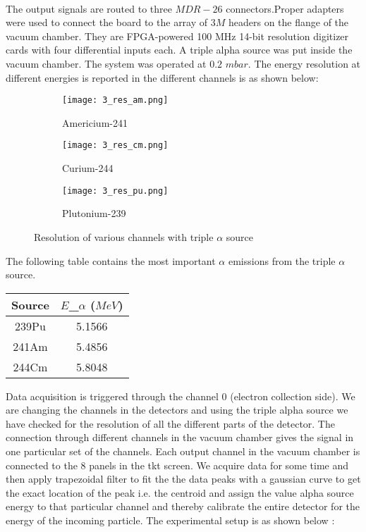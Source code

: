 \documentclass[a4paper, 11pt]{article}
\begin{document}
\paragraph{}
The  output  signals  are  routed  to  three $MDR - 26$  connectors.Proper adapters were used to connect the board to the array of $3M$ headers on the flange of the vacuum chamber. They are FPGA-powered 100 MHz 14-bit resolution digitizer cards with four  differential  inputs  each.  A triple alpha source was put inside the vacuum chamber.  The  system  was  operated  at  $0.2$  $mbar$.  The  energy resolution at different energies is reported in the different channels is as shown below:
 
\begin{figure}[h]
 
\begin{subfigure}{0.5\textwidth}
\texttt{[image: 3\_res\_am.png]} 
\caption{Americium-241}
\label{fig:subim1}
\end{subfigure}
\begin{subfigure}{0.5\textwidth}
\texttt{[image: 3\_res\_cm.png]}
\caption{Curium-244}
\label{fig:subim2}
\end{subfigure}

\begin{subfigure}{0.5\textwidth}
\centering
\texttt{[image: 3\_res\_pu.png]}
\caption{Plutonium-239}
\label{fig:subim2}
\end{subfigure}

\caption{Resolution of various channels with triple $\alpha$ source}
\label{fig:image2}

\end{figure} 
The following table contains the most important $\alpha$  emissions from the triple $\alpha$  source.

\begin{center}
\begin{tabular}{ |c|c| } 
 \hline
 Source & $E$_$\alpha$ ($MeV$)  \\ 
 \hline
 239Pu & 5.1566  \\
 \hline
 241Am & 5.4856  \\ 
 \hline
 244Cm & 5.8048 \\
 \hline
\end{tabular}
\end{center}


 
Data acquisition is triggered through the channel $0$ (electron collection side). We are changing the channels in the detectors and using the triple alpha source we have checked for the resolution of all the different parts of the detector. The connection through different channels in the vacuum chamber gives the signal in one particular set of the channels. Each output channel in the vacuum chamber is connected to the $8$ panels in the tkt screen. We acquire data for some time and then apply trapezoidal filter to fit the the data peaks with a gaussian curve to get the exact location of the peak i.e. the centroid  and assign the value alpha source energy to that particular channel and thereby calibrate the entire detector for the energy of the incoming particle. The experimental setup is as shown below :
\end{document}
